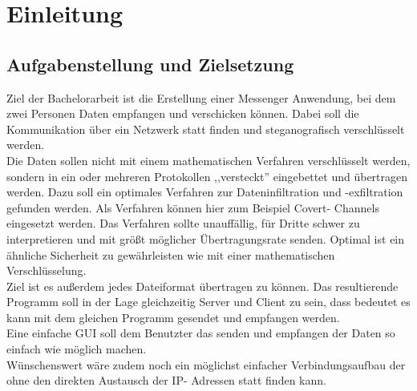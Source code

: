 

\chapter{Einleitung}
\label{cha:einleitung}

\section {Aufgabenstellung und Zielsetzung}

Ziel der Bachelorarbeit ist die Erstellung einer Messenger Anwendung, bei dem zwei Personen Daten empfangen und verschicken können. Dabei soll die Kommunikation über ein Netzwerk statt finden und steganografisch verschlüsselt werden.\\ Die Daten sollen nicht mit einem mathematischen Verfahren verschlüsselt werden, sondern in ein oder mehreren Protokollen ,,versteckt'' eingebettet und übertragen werden. Dazu soll ein optimales Verfahren zur Dateninfiltration und -exfiltration gefunden werden. Als Verfahren können hier zum Beispiel Covert- Channels eingesetzt werden. Das Verfahren sollte unauffällig, für Dritte schwer zu interpretieren und mit größt möglicher Übertragungsrate senden. Optimal ist ein ähnliche Sicherheit zu gewährleisten wie mit einer mathematischen Verschlüsselung.\\
Ziel ist es außerdem jedes Dateiformat übertragen zu können. Das resultierende Programm soll in der Lage gleichzeitig Server und Client zu sein, dass bedeutet es kann mit dem gleichen Programm gesendet und empfangen werden.\\
Eine einfache GUI soll dem Benutzter das senden und empfangen der Daten so einfach wie möglich machen.\\
Wünschenswert wäre zudem noch ein möglichst einfacher Verbindungsaufbau der ohne den direkten Austausch der IP- Adressen statt finden kann.


